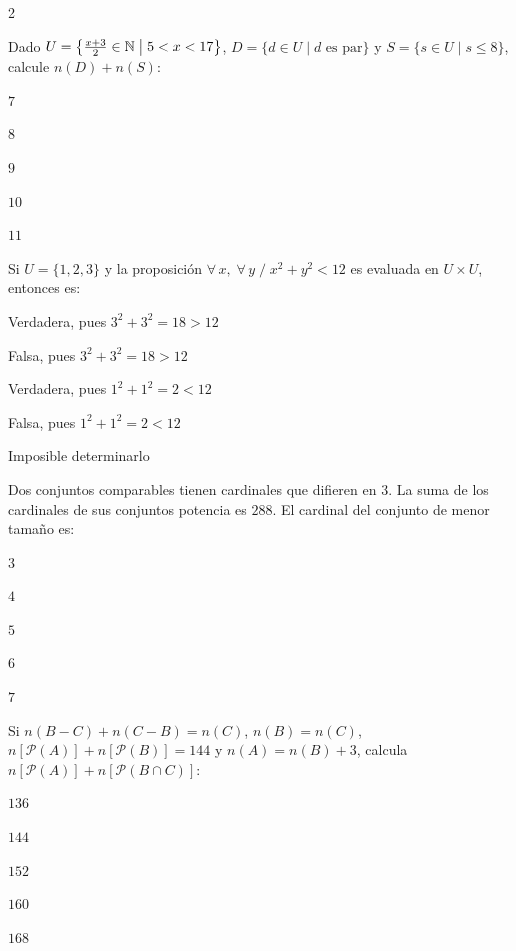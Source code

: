 \begin{multicols}{2}

\ejercicio Dado $U = \bigl\{\tfrac{x+3}{2} \in \mathbb{N}
\bigm| 5 < x < 17\bigr\}$, $D = \{d \in U \mid d \text{ es par}\}$
y $S = \{s \in U \mid s \leq 8\}$, calcule $n(D) + n(S)$:
\begin{alternativas}
  \item $7$
  \item $8$
  \item $9$
  \item $10$
  \item $11$
\end{alternativas}

\vspace{0.3cm}

\ejercicio Si $U = \{1,2,3\}$ y la proposici\'on
$\forall\, x,\; \forall\, y \;/\; x^{2} + y^{2} < 12$
es evaluada en $U \times U$, entonces es:
\begin{alternativas}
  \item Verdadera, pues $3^{2}+3^{2}=18>12$
  \item Falsa, pues $3^{2}+3^{2}=18>12$
  \item Verdadera, pues $1^{2}+1^{2}=2<12$
  \item Falsa, pues $1^{2}+1^{2}=2<12$
  \item Imposible determinarlo
\end{alternativas}

\vspace{0.3cm}

\ejercicio Dos conjuntos comparables tienen cardinales que difieren en $3$.
La suma de los cardinales de sus conjuntos potencia es $288$.
El cardinal del conjunto de menor tama\~no es:
\begin{alternativas}
  \item $3$
  \item $4$
  \item $5$
  \item $6$
  \item $7$
\end{alternativas}

\vspace{0.3cm}

\ejercicio Si $n(B-C)+n(C-B)=n(C)$, $n(B)=n(C)$,
$n[\mathcal{P}(A)]+n[\mathcal{P}(B)]=144$ y $n(A)=n(B)+3$,
calcula $n[\mathcal{P}(A)]+n[\mathcal{P}(B \cap C)]$:
\begin{alternativas}
  \item $136$
  \item $144$
  \item $152$
  \item $160$
  \item $168$
\end{alternativas}


\end{multicols}
